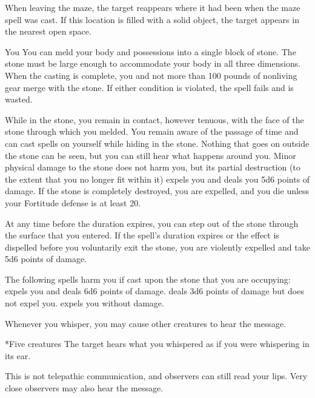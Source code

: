 When leaving the maze, the target reappears where it had been when the maze spell was cast. If this location is filled with a solid object, the target appears in the nearest open space.

\norepeatspellnotes

\spelldur{\durlong}
\begin{spelltarget}{You}
    \spelleffect You can meld your body and possessions into a single block of stone. The stone must be large enough to accommodate your body in all three dimensions. When the casting is complete, you and not more than 100 pounds of nonliving gear merge with the stone. If either condition is violated, the spell fails and is wasted.
    \par While in the stone, you remain in contact, however tenuous, with the face of the stone through which you melded. You remain aware of the passage of time and can cast spells on yourself while hiding in the stone. Nothing that goes on outside the stone can be seen, but you can still hear what happens around you. Minor physical damage to the stone does not harm you, but its partial destruction (to the extent that you no longer fit within it) expels you and deals you 5d6 points of damage. If the stone is completely destroyed, you are expelled, and you die unless your Fortitude defense is at least 20.
    \par At any time before the duration expires, you can step out of the stone through the surface that you entered. If the spell's duration expires or the effect is dispelled before you voluntarily exit the stone, you are violently expelled and take 5d6 points of damage.
\end{spelltarget}
\spellnotes The following spells harm you if cast upon the stone that you are occupying:  expels you and deals 6d6 points of damage.  deals 3d6 points of damage but does not expel you.  expels you without damage.

\spelldur{\durlong}
\spellline
\spelleffect Whenever you whisper, you may cause other creatures to hear the message.
\spellrng{\rngmed}
\begin{spelltargets}*{Five creatures}
    \spelleffect The target hears what you whispered as if you were whispering in its ear.
\end{spelltargets}
\spellnotes This is not telepathic communication, and observers can still read your lips. Very close observers may also hear the message.

